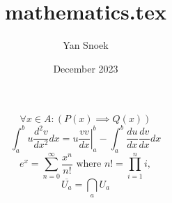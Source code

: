\documentclass{article}
\title{mathematics.tex}
\author{Yan Snoek}
\date{December 2023}
\begin{document}
\maketitle

\[\forall x \in A :(P(x) \implies Q(x))\]
\[\int_{a}^{b} u \frac{d^2 v}{dx^2} dx = \left.u\frac{vv}{dx}\right |_{a}^{b} - \int_{a}^{b}\frac{du}{dx}\frac{dv}{dx}dx\]
\[e^x = \sum_{n=0}^\infty \frac{x^n}{n!} \text{ where } n! = \prod_{i=1}^n i,\] \[ \overline{U_a} = \bigcap_a U_a\]
\end{document}
